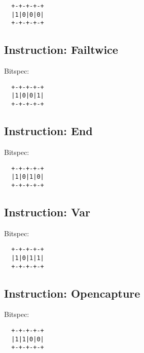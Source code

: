 \begin{myquote}
\begin{verbatim}
  +-+-+-+-+
  |1|0|0|0|
  +-+-+-+-+
\end{verbatim}
\end{myquote}
  
\subsection{Instruction: Failtwice}

Bitspec:

\begin{myquote}
\begin{verbatim}
  +-+-+-+-+
  |1|0|0|1|
  +-+-+-+-+
\end{verbatim}
\end{myquote}
  
\subsection{Instruction: End}

Bitspec:

\begin{myquote}
\begin{verbatim}
  +-+-+-+-+
  |1|0|1|0|
  +-+-+-+-+
\end{verbatim}
\end{myquote}
  
\subsection{Instruction: Var}

Bitspec:

\begin{myquote}
\begin{verbatim}
  +-+-+-+-+
  |1|0|1|1|
  +-+-+-+-+
\end{verbatim}
\end{myquote}
  
\subsection{Instruction: Opencapture}

Bitspec:

\begin{myquote}
\begin{verbatim}
  +-+-+-+-+
  |1|1|0|0|
  +-+-+-+-+
\end{verbatim}
\end{myquote}
  
